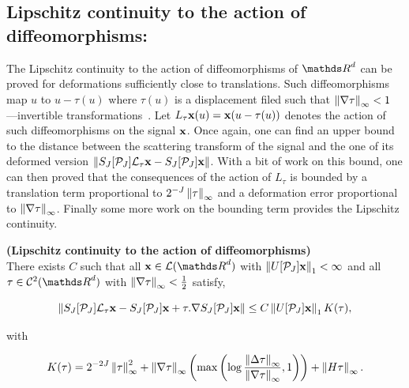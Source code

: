 \documentclass[a4paper,11pt]{report}
\begin{document}
		\subsection{Lipschitz continuity to the action of diffeomorphisms:}
			\label{subsec:ST/Pties/Lipschitz continuity}			
			The Lipschitz continuity to the action of diffeomorphisms of $\dsR^{d}$ can be proved for deformations sufficiently close to translations. Such diffeomorphisms map $u$ to $u-\tau(u)$ where $\tau(u)$ is a displacement filed such that $\left\lVert \nabla \tau \right\rVert_{\infty} < 1$ ---\ie invertible transformations~\citep{bruna2013invariant}. Let $L_{\tau}{\bf x}(u)={\bf x}(u-\tau(u))$ denotes the action of such diffeomorphisms on the signal ${\bf x}$. Once again, one can find an upper bound to the distance between the scattering transform of the signal and the one of its deformed version $\left\lVert S_{J}[\mathcal{P}_{J}]\mathcal{L}_{\tau}{\bf x} - S_{J}[\mathcal{P}_{J}]{\bf x} \right\rVert$. With a bit of work on this bound, one can then proved that the consequences of the action of $L_{\tau}$ is bounded by a translation term proportional to $2^{-J} \left\lVert \tau \right\rVert_{\infty}$ and a deformation error proportional to $\left\lVert \nabla \tau \right\rVert_{\infty}$. Finally some more work on the bounding term provides the Lipschitz continuity.
			
			\begin{thm} \textbf{(Lipschitz continuity to the action of diffeomorphisms)} \\
			  There exists $C$ such that all $\bfx \in \mcalL(\dsR^{d})$ with $\left\lVert U[\mathcal{P}_{J}]{\bf x} \right\rVert_{1} < \infty$ and all $\tau \in \mcalC^{2}(\dsR^{d})$ with $\left\lVert \nabla \tau \right\rVert_{\infty} < \frac{1}{2}$ satisfy,
			  
			  \begin{equation}
					\left\lVert S_{J}[\mathcal{P}_{J}]\mathcal{L}_{\tau}{\bf x} - S_{J}[\mathcal{P}_{J}]{\bf x} + \tau . \nabla S_{J}[\mathcal{P}_{J}]{\bf x} \right\rVert \leq C \left\lVert U[\mathcal{P}_{J}]{\bf x} \right\rVert_{1} K(\tau),
					\label{eq:Lipschitz continuity 1}
			  \end{equation}

			  with
			  
			  \begin{equation}
					K(\tau) = 2^{-2J} \left\lVert \tau \right\rVert_{\infty}^{2} + \left\lVert \nabla \tau \right\rVert_{\infty} \left(\max \left( \log \frac{\left\lVert \Delta \tau \right\rVert_{\infty}}{\left\lVert \nabla \tau \right\rVert_{\infty}},1 \right) \right) + \left\lVert H\tau \right\rVert_{\infty}.
					\label{eq:Lipschitz continuity K(tau)}
			  \end{equation}
			  \label{thm:Lipschitz continuity}
			\end{thm}
			
\end{document}
